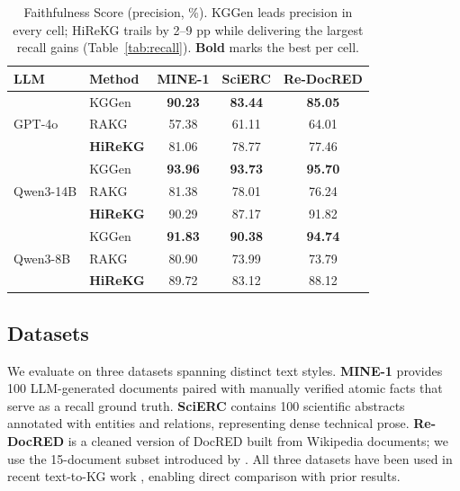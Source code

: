 \documentclass[11pt]{article}
\begin{document}
\begin{table}[t!]
\centering
\small
\setlength{\tabcolsep}{4pt}
\begin{tabular}{ll|ccc}
\toprule
\textbf{LLM} & \textbf{Method} & \textbf{MINE-1} & \textbf{SciERC} & \textbf{Re-DocRED} \\
\midrule
\multirow{3}{*}{GPT-4o} 
& KGGen           & \textbf{90.23} & \textbf{83.44} & \textbf{85.05} \\
& RAKG            & 57.38          & 61.11          & 64.01 \\
& \textbf{HiReKG} & 81.06          & 78.77          & 77.46 \\
\midrule
\multirow{3}{*}{Qwen3-14B} 
& KGGen           & \textbf{93.96} & \textbf{93.73} & \textbf{95.70} \\
& RAKG            & 81.38          & 78.01          & 76.24 \\
& \textbf{HiReKG} & 90.29          & 87.17          & 91.82 \\
\midrule
\multirow{3}{*}{Qwen3-8B} 
& KGGen           & \textbf{91.83} & \textbf{90.38} & \textbf{94.74} \\
& RAKG            & 80.90          & 73.99          & 73.79 \\
& \textbf{HiReKG} & 89.72          & 83.12          & 88.12 \\
\bottomrule
\end{tabular}
\caption{Faithfulness Score (precision, \%). KGGen leads precision in every cell; HiReKG trails by 2--9 pp while delivering the largest recall gains (Table~\ref{tab:recall}). \textbf{Bold} marks the best per cell.}
\label{tab:faith}
\end{table}




\subsection{Datasets}
\label{sec:datasets}
We evaluate on three datasets spanning distinct text styles. \textbf{MINE-1} \citep{kggen} provides 100 LLM-generated documents paired with manually verified atomic facts that serve as a recall ground truth. \textbf{SciERC} \citep{scierc} contains 100 scientific abstracts    annotated with entities and relations, representing dense technical prose. \textbf{Re-DocRED} \citep{redocred} is a cleaned version of DocRED \citep{docred} built from Wikipedia documents; we use the 15-document subset introduced by \citet{lkd-kgc}. All three datasets have been used in recent text-to-KG work \citep{graphjudge, rakg}, enabling direct comparison with prior results.
\end{document}
